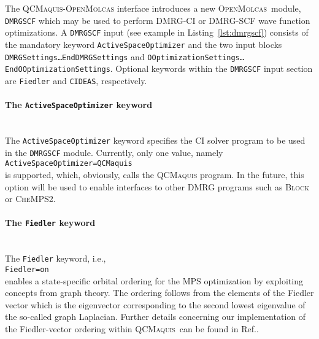 \documentclass[bibliography=totoc,12pt,a4paper]{scrartcl}
\newcommand{\mol}{\textsc{OpenMolcas}}
\newcommand{\qcm}{\textsc{QCMaquis}}
\newcommand{\hostp}{\mol}
\newcommand{\kwd}[1]{\texttt{#1}}
\begin{document}
The \qcm-\mol{} interface introduces a new \hostp\ module, \texttt{DMRGSCF} which may be used to perform DMRG-CI or DMRG-SCF wave function optimizations. A \texttt{DMRGSCF} input (see example in Listing~\ref{lst:dmrgscf}) consists of the mandatory keyword \kwd{ActiveSpaceOptimizer} and the two input blocks \kwd{DMRGSettings\ldots{}EndDMRGSettings} and \kwd{OOptimizationSettings\ldots{}EndOOptimizationSettings}. Optional keywords within the \texttt{DMRGSCF} input section are \kwd{Fiedler} and \kwd{CIDEAS}, respectively.

\paragraph{The \kwd{ActiveSpaceOptimizer} keyword}\mbox{}\\
The \kwd{ActiveSpaceOptimizer} keyword specifies the CI solver program to be used in the \kwd{DMRGSCF} module. Currently, only one value, namely\\
\noindent\kwd{ActiveSpaceOptimizer=QCMaquis}\\
is supported, which, obviously, calls the \qcm{} program. In the future, this option will be used to enable interfaces to other DMRG programs such as \textsc{Block} or \textsc{CheMPS2}.

\paragraph{The \kwd{Fiedler} keyword}\mbox{}\\
The \kwd{Fiedler} keyword, i.e.,\\
\noindent\kwd{Fiedler=on}\\
enables a state-specific orbital ordering for the MPS optimization
by exploiting concepts from graph theory. The ordering follows from the elements of the
Fiedler vector \cite{fied73,fied75} which is the eigenvector corresponding to the second
lowest eigenvalue of the so-called graph Laplacian.
Further details concerning our implementation of the Fiedler-vector ordering within \qcm\ can be found in Ref.\cite{interface}.
\end{document}
